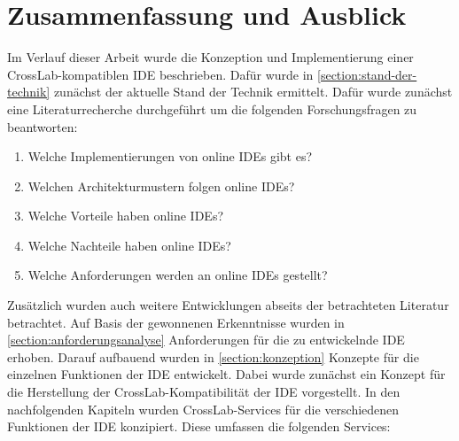 \chapter{Zusammenfassung und Ausblick}\label{section:zusammenfassung-und-ausblick}


Im Verlauf dieser Arbeit wurde die Konzeption und Implementierung einer CrossLab-kompatiblen IDE beschrieben. Dafür wurde in \autoref{section:stand-der-technik} zunächst der aktuelle Stand der Technik ermittelt. Dafür wurde zunächst eine Literaturrecherche durchgeführt um die folgenden Forschungsfragen zu beantworten:

\begin{enumerate}
    \item Welche Implementierungen von online IDEs gibt es?
    \item Welchen Architekturmustern folgen online IDEs?
    \item Welche Vorteile haben online IDEs?
    \item Welche Nachteile haben online IDEs?
    \item Welche Anforderungen werden an online IDEs gestellt?
\end{enumerate}

Zusätzlich wurden auch weitere Entwicklungen abseits der betrachteten Literatur betrachtet. Auf Basis der gewonnenen Erkenntnisse wurden in \autoref{section:anforderungsanalyse} Anforderungen für die zu entwickelnde IDE erhoben. Darauf aufbauend wurden in \autoref{section:konzeption} Konzepte für die einzelnen Funktionen der IDE entwickelt. Dabei wurde zunächst ein Konzept für die Herstellung der CrossLab-Kompatibilität der IDE vorgestellt. In den nachfolgenden Kapiteln wurden CrossLab-Services für die verschiedenen Funktionen der IDE konzipiert. Diese umfassen die folgenden Services:

